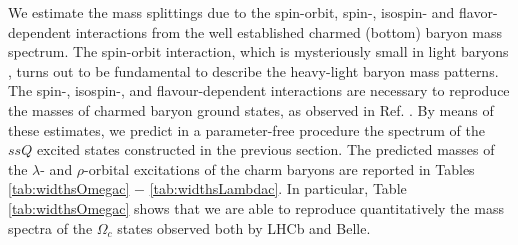 \documentclass[twocolumn,superscriptaddress,preprintnumbers,nofootinbib]{revtex4}
\begin{document}

We estimate the mass splittings due to the spin-orbit, spin-, isospin- and flavor-dependent interactions from the well established charmed (bottom) baryon mass spectrum.
The spin-orbit interaction, which is mysteriously small in light baryons \cite{Capstick:1986bm,Ebert:2007nw}, turns out to be fundamental to describe the heavy-light baryon mass patterns.
The spin-, isospin-, and flavour-dependent interactions are necessary to reproduce the masses of charmed baryon ground states, as observed in Ref. \cite{Santopinto:2016pkp}. 
By means of these estimates, we predict in a parameter-free procedure the spectrum of the $ssQ$ excited states constructed in the previous section.
The predicted masses of the $\lambda$- and $\rho$-orbital excitations of the charm baryons are reported in Tables \ref{tab:widthsOmegac} $-$ \ref{tab:widthsLambdac}. In particular, Table \ref{tab:widthsOmegac} shows that we are able to reproduce quantitatively the mass spectra of the $\Omega_{c}$ states observed both by LHCb and  Belle.
\end{document}
